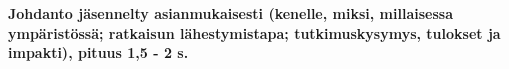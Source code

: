 \documentclass[finnish, grading]{tktltiki2}
\theoremstyle{definition}
\theoremstyle{remark}
\begin{document}
%
%
%

%


\textbf{Johdanto jäsennelty asianmukaisesti (kenelle, miksi, millaisessa ympäristössä; ratkaisun lähestymistapa; tutkimuskysymys, tulokset ja impakti),
pituus 1,5 - 2 s.}
\end{document}
